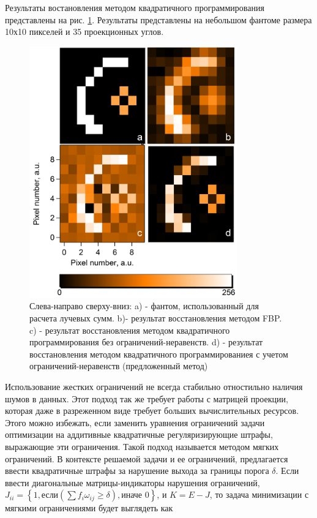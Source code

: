 Результаты востановления методом квадратичного программирования представлены на рис. \ref{im:quadprog}.
Результаты представлены на небольшом фантоме размера 10х10 пикселей и 35 проекционных углов.

\begin{figure}
  \centering
  \includegraphics[width=0.8\textwidth]{Dissertation/images/part2_img/quadprog}
  \caption{Слева-направо сверху-вниз: a) - фантом, использованный для расчета лучевых сумм. b)- результат восстановления методом FBP. c) - результат восстановления методом квадратичного программирования без ограничений-неравенств. d) - результат восстановления методом квадратичного программированиея с учетом ограничений-неравенств (предложенный метод)}
  \label{im:quadprog}
\end{figure}

Использование жестких ограничений не всегда стабильно отностильно наличия шумов в данных.
Этот подход так же требует работы с матрицей проекции, которая даже в разреженном виде требует больших вычислительных ресурсов.
Этого можно избежать, если заменить уравнения ограничений задачи оптимизации на аддитивные квадратичные регуляризирующие штрафы, выражающие эти ограничения.
Такой подход называется методом мягких ограничений.
В контексте решаемой задачи и ее ограничений, предлагается ввести квадратичные штрафы за нарушение выхода за границы порога $\delta$.
Если ввести диагональные матрицы-индикаторы нарушения ограничений, $J_{ii} = \left\{1, \mbox{если} \left(\sum f_{i} \omega_{ij} \geq \delta \right), \mbox{иначе } 0\right\}$, и $K = E - J$, то задача минимизации с мягкими ограничениями будет выглядеть как

